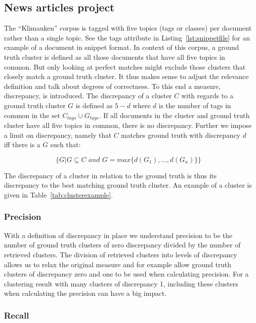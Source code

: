 \subsection{News articles project}
The ``Klimauken'' corpus is tagged with five topics (tags or classes) per document rather than a single topic. See the tags attribute in Listing~\ref{lst:snippetfile} for an example of a document in snippet format. In context of this corpus, a ground truth cluster is defined as all those documents that have all five topics in common. But only looking at perfect matches might exclude those clusters that closely match a ground truth cluster. It thus makes sense to adjust the relevance definition and talk about degrees of correctness. To this end a measure, discrepancy, is introduced. The discrepancy of a cluster \(C\) with regards to a ground truth cluster \(G\) is defined as \(5 - d\) where \(d\) is the number of tags in common in the set \(C_{tags} \cup G_{tags}\). If all documents in the cluster and ground truth cluster have all five topics in common, there is no discrepancy. Further we impose a limit on discrepancy, namely that \(C\) matches ground truth with discrepancy \(d\) iff there is a \(G\) such that:

\begin{displaymath}
\{ G \vert G \subseteq C \textit{ and } G = max\{d(G_{1}), \dots, d(G_{n})\}\}
\end{displaymath}

The discrepancy of a cluster in relation to the ground truth is thus its discrepancy to the best matching ground truth cluster. An example of a cluster is given in Table~\ref{tab:clusterexample}.

\subsubsection{Precision}
With a definition of discrepancy in place we understand precision to be the number of ground truth clusters of zero discrepancy divided by the number of retrieved clusters. The division of retrieved clusters into levels of discrepancy allows us to relax the original measure and for example allow ground truth clusters of discrepancy zero and one to be used when calculating precision. For a clustering result with many clusters of discrepancy 1, including these clusters when calculating the precision can have a big impact.

\subsubsection{Recall}

